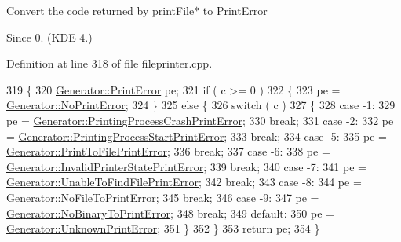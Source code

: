 Convert the code returned by print\+File$\ast$ to Print\+Error \begin{DoxySince}{Since}
0. (K\+D\+E 4.) 
\end{DoxySince}


Definition at line 318 of file fileprinter.\+cpp.


\begin{DoxyCode}
319 \{
320     \hyperlink{classOkular_1_1Generator_a43266d4eb3e7929924dd10ea53bc1d61}{Generator::PrintError} pe;
321     \textcolor{keywordflow}{if} ( c >= 0 )
322     \{
323         pe = \hyperlink{classOkular_1_1Generator_a43266d4eb3e7929924dd10ea53bc1d61a6186f0488397997c9a950b5e5c1b472d}{Generator::NoPrintError};
324     \} 
325     \textcolor{keywordflow}{else} \{
326         \textcolor{keywordflow}{switch} ( c )
327         \{
328             \textcolor{keywordflow}{case} -1:
329                 pe = \hyperlink{classOkular_1_1Generator_a43266d4eb3e7929924dd10ea53bc1d61a4888a7455baba78b6f8cfe351956ba5e}{Generator::PrintingProcessCrashPrintError};
330                 \textcolor{keywordflow}{break};
331             \textcolor{keywordflow}{case} -2:
332                 pe = \hyperlink{classOkular_1_1Generator_a43266d4eb3e7929924dd10ea53bc1d61a2266cdd2bd6a63a77c566cd49e73839f}{Generator::PrintingProcessStartPrintError};
333                 \textcolor{keywordflow}{break};
334             \textcolor{keywordflow}{case} -5:
335                 pe = \hyperlink{classOkular_1_1Generator_a43266d4eb3e7929924dd10ea53bc1d61a0730ff074dea39b2f31be7d33812918a}{Generator::PrintToFilePrintError};
336                 \textcolor{keywordflow}{break};
337             \textcolor{keywordflow}{case} -6:
338                 pe = \hyperlink{classOkular_1_1Generator_a43266d4eb3e7929924dd10ea53bc1d61ae485c9d2113f08df22f841cdec5a6916}{Generator::InvalidPrinterStatePrintError};
339                 \textcolor{keywordflow}{break};
340             \textcolor{keywordflow}{case} -7:
341                 pe = \hyperlink{classOkular_1_1Generator_a43266d4eb3e7929924dd10ea53bc1d61a53237e1ad4d6e5145e29604834057b59}{Generator::UnableToFindFilePrintError};
342                 \textcolor{keywordflow}{break};
343             \textcolor{keywordflow}{case} -8:
344                 pe = \hyperlink{classOkular_1_1Generator_a43266d4eb3e7929924dd10ea53bc1d61ae954cba05c7a5435588cf0ed29e2a890}{Generator::NoFileToPrintError};
345                 \textcolor{keywordflow}{break};
346             \textcolor{keywordflow}{case} -9:
347                 pe = \hyperlink{classOkular_1_1Generator_a43266d4eb3e7929924dd10ea53bc1d61aa872427640e4ae32edc173645f3673d9}{Generator::NoBinaryToPrintError};
348                 \textcolor{keywordflow}{break};
349             \textcolor{keywordflow}{default}:
350                 pe = \hyperlink{classOkular_1_1Generator_a43266d4eb3e7929924dd10ea53bc1d61a263e9cc38c84824414ea0b65e8deb408}{Generator::UnknownPrintError};
351         \}
352     \}
353     \textcolor{keywordflow}{return} pe;
354 \}
\end{DoxyCode}

